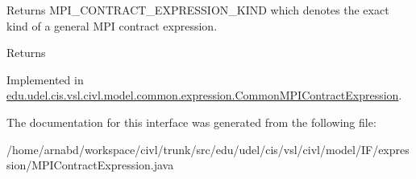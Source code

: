 Returns M\+P\+I\+\_\+\+C\+O\+N\+T\+R\+A\+C\+T\+\_\+\+E\+X\+P\+R\+E\+S\+S\+I\+O\+N\+\_\+\+K\+I\+N\+D which denotes the exact kind of a general M\+P\+I contract expression. 

\begin{DoxyReturn}{Returns}

\end{DoxyReturn}


Implemented in \hyperlink{classedu_1_1udel_1_1cis_1_1vsl_1_1civl_1_1model_1_1common_1_1expression_1_1CommonMPIContractExpression_a4f2d856889c9ced9a515f204eecb8e5d}{edu.\+udel.\+cis.\+vsl.\+civl.\+model.\+common.\+expression.\+Common\+M\+P\+I\+Contract\+Expression}.



The documentation for this interface was generated from the following file\+:\begin{DoxyCompactItemize}
\item 
/home/arnabd/workspace/civl/trunk/src/edu/udel/cis/vsl/civl/model/\+I\+F/expression/M\+P\+I\+Contract\+Expression.\+java\end{DoxyCompactItemize}
